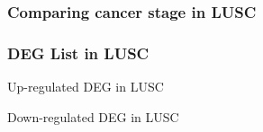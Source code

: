 \documentclass{beamer}
\begin{document}
    \subsubsection{Comparing cancer stage in LUSC}
    \begin{frame}
        \frametitle{DEG List in LUSC}

        \begin{table}
            \caption{Up-regulated DEG in LUSC}
            
        \end{table}

        \begin{table}
            \caption{Down-regulated DEG in LUSC}
            
        \end{table}
    \end{frame}
\end{document}
